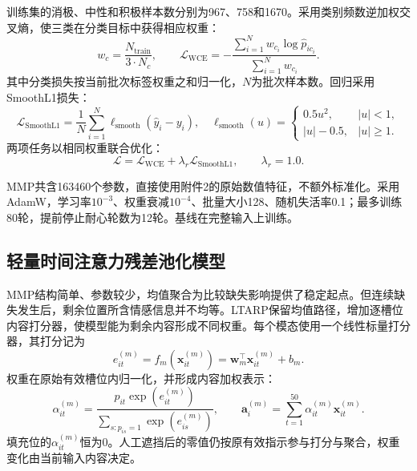\documentclass[UTF8,a4paper,11pt]{ctexart}
\newcommand{\QTwoParagraph}{\par\noindent\hspace*{2em}}
\newcounter{q2algorithm}
\begin{document}
\QTwoParagraph 训练集的消极、中性和积极样本数分别为967、758和1670。采用类别频数逆加权交叉熵，使三类在分类目标中获得相应权重：
\begin{equation}
w_c = \frac{N_{\mathrm{train}}}{3 \cdot N_c},\qquad
\mathcal L_{\mathrm{WCE}} = -\frac{\sum_{i=1}^N w_{c_i}\log\hat p_{i c_i}}{\sum_{i=1}^N w_{c_i}}.
\end{equation}
其中分类损失按当前批次标签权重之和归一化，$N$为批次样本数。回归采用SmoothL1损失：
\begin{equation}
\mathcal L_{\mathrm{SmoothL1}} = \frac{1}{N}\sum_{i=1}^N \ell_{\mathrm{smooth}}(\hat y_i - y_i),\quad
\ell_{\mathrm{smooth}}(u) = \begin{cases}
0.5 u^2, & |u| < 1,\\
|u| - 0.5, & |u| \ge 1.
\end{cases}
\end{equation}
两项任务以相同权重联合优化：
\begin{equation}
\mathcal L = \mathcal L_{\mathrm{WCE}} + \lambda_r \mathcal L_{\mathrm{SmoothL1}},\qquad \lambda_r = 1.0.
\label{eq:q2_loss_full}
\end{equation}

\QTwoParagraph MMP共含163460个参数，直接使用附件2的原始数值特征，不额外标准化。采用AdamW，学习率$10^{-3}$、权重衰减$10^{-4}$、批量大小128、随机失活率0.1；最多训练80轮，提前停止耐心轮数为12轮。基线在完整输入上训练。

\subsection{轻量时间注意力残差池化模型}\label{subsec:q2_pool}
\QTwoParagraph MMP结构简单、参数较少，均值聚合为比较缺失影响提供了稳定起点。但连续缺失发生后，剩余位置所含情感信息并不均等。LTARP保留均值路径，增加逐槽位内容打分器，使模型能为剩余内容形成不同权重。每个模态使用一个线性标量打分器，其打分记为
\begin{equation}
e_{it}^{(m)} = f_m(\mathbf x_{it}^{(m)}) = \mathbf w_m^\top\mathbf x_{it}^{(m)} + b_m.
\end{equation}
权重在原始有效槽位内归一化，并形成内容加权表示：
\begin{equation}
\alpha_{it}^{(m)} = \frac{p_{it}\exp(e_{it}^{(m)})}{\sum_{s: p_{is}=1} \exp(e_{is}^{(m)})},\qquad
\mathbf a_i^{(m)} = \sum_{t=1}^{50} \alpha_{it}^{(m)} \mathbf x_{it}^{(m)}.
\label{eq:q2_alpha_softmax}
\end{equation}
填充位的$\alpha_{it}^{(m)}$恒为0。人工遮挡后的零值仍按原有效指示参与打分与聚合，权重变化由当前输入内容决定。
\end{document}
